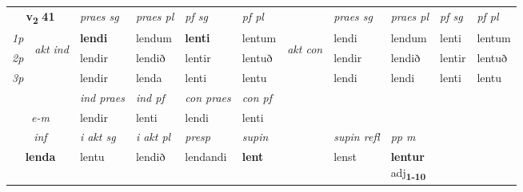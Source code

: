 \noindent
\begin{tabular}{lllllllllll} \toprule
\multicolumn{2}{c}{\textbf{v{\textsubscript{2}}} \Large{\textbf{41}}}  &  \textit{praes sg}  & \textit{praes pl}  &\textit{ pf sg} & \textit{pf pl} &  &  \textit{praes sg}  & \textit{praes pl}  & \textit{pf sg} & \textit{pf pl } \\*
	\cmidrule{3-6} \cmidrule{8-11}
 {\textit{1p}} & \multirow{3}{*}{\begin{turn}{90}\textit{akt ind}\end{turn}} & \textbf{lendi} & lendum & \textbf{lenti} & lentum & \multirow{3}{*}{\begin{turn}{90}\textit{akt con}\end{turn}} &lendi & lendum & lenti & lentum\\*
 {\textit{2p}} &  &  lendir  & lendið & lentir & lentuð & & lendir & lendið & lentir & lentuð \\*
{\textit{3p}} &  & lendir & lenda & lenti & lentu & & lendi & lendi& lenti & lentu \\*
\cmidrule{3-6} \cmidrule{8-11}

   & &  \textit{ind praes} & \textit{ind pf} & \textit{con praes} & \textit{con pf} \\*
\multicolumn{2}{c}{ \textit{e-m} } & lendir & lenti & lendi & lenti \\*

\cmidrule{3-9}
   \multicolumn{2}{c}{\textit{inf}}  & \textit{i akt sg} & \textit{i akt pl}   & \textit{presp} & \textit{supin} && \textit{supin refl} & \textit{pp m} \\*
  \multicolumn{2}{c}{\textbf{lenda}} & lentu  & lendið   & lendandi &  \textbf{lent} && lenst & \specialcell{\textbf{lentur} \\ adj\textbf{\textsubscript{1-10}}} \\*
\end{tabular}

